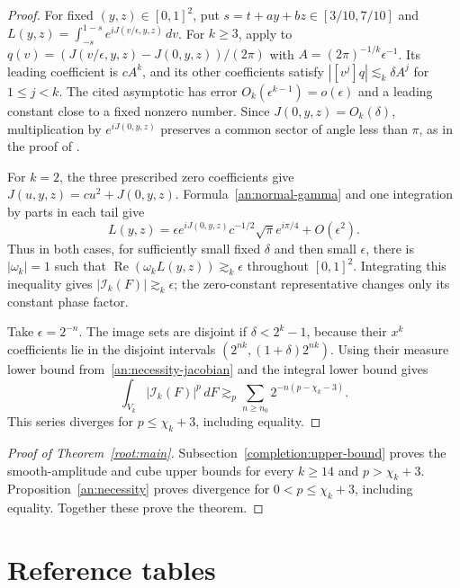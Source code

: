 \documentclass[11pt]{amsart}
\theoremstyle{definition}
\theoremstyle{remark}
\numberwithin{equation}{section}
\begin{document}
\begin{proof}
For fixed $(y,z)\in[0,1]^2$, put $s=t+ay+bz\in[3/10,7/10]$ and $L(y,z)=\int_{-s}^{1-s}e^{iJ(v/\epsilon,y,z)}\,dv$. For $k\ge3$, apply \cite[Lemma 6.4]{BGZZK} to $q(v)=(J(v/\epsilon,y,z)-J(0,y,z))/(2\pi)$ with $A=(2\pi)^{-1/k}\epsilon^{-1}$. Its leading coefficient is $cA^k$, and its other coefficients satisfy $|[v^j]q|\lesssim_k \delta A^j$ for $1\le j<k$. The cited asymptotic has error $O_k(\epsilon^{k-1})=o(\epsilon)$ and a leading constant close to a fixed nonzero number. Since $J(0,y,z)=O_k(\delta)$, multiplication by $e^{iJ(0,y,z)}$ preserves a common sector of angle less than $\pi$, as in the proof of \cite[Lemma 6.2]{BGZZK}.

For $k=2$, the three prescribed zero coefficients give $J(u,y,z)=cu^2+J(0,y,z)$. Formula~\eqref{an:normal-gamma} and one integration by parts in each tail give
\[
L(y,z)=\epsilon e^{iJ(0,y,z)}c^{-1/2}\sqrt\pi e^{i\pi/4}+O(\epsilon^2).
\]
Thus in both cases, for sufficiently small fixed $\delta$ and then small $\epsilon$, there is $|\omega_k|=1$ such that $\operatorname{Re}(\omega_kL(y,z))\gtrsim_k\epsilon$ throughout $[0,1]^2$. Integrating this inequality gives $|\mathcal I_k(F)|\gtrsim_k\epsilon$; the zero-constant representative changes only its constant phase factor.

Take $\epsilon=2^{-n}$. The image sets are disjoint if $\delta<2^k-1$, because their $x^k$ coefficients lie in the disjoint intervals $(2^{nk},(1+\delta)2^{nk})$. Using their measure lower bound from~\eqref{an:necessity-jacobian} and the integral lower bound gives
\[
\int_{V_k}|\mathcal I_k(F)|^p\,dF\gtrsim_p\sum_{n\ge n_0}2^{-n(p-\chi_k-3)}.
\]
This series diverges for $p\le\chi_k+3$, including equality.
\end{proof}

\begin{proof}[Proof of Theorem~\ref{root:main}]\label{an:main-proof}
Subsection~\ref{completion:upper-bound} proves the smooth-amplitude and cube upper bounds for every $k\ge14$ and $p>\chi_k+3$. Proposition~\ref{an:necessity} proves divergence for $0<p\le\chi_k+3$, including equality. Together these prove the theorem.
\end{proof}
\appendix
\section{Reference tables}\label{app:reference-tables}
\renewcommand{\thetable}{A.\arabic{table}}
\renewcommand{\theHtable}{A.\arabic{table}}
\setcounter{table}{0}
\end{document}
